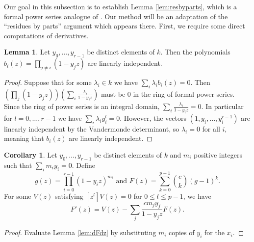 \documentclass{amsart}
\numberwithin{equation}{section}
\theoremstyle{definition}
\newtheorem{lemma}[theorem]{Lemma}
\newtheorem{corollary}[theorem]{Corollary}
\begin{document}
Our goal in this subsection is to establish Lemma \ref{lem:resbyparts}, which is a formal power series analogue of \cite[Lemma 3.4]{CE}.  Our method will be an adaptation of the ``residues by parts'' argument which appears there.  First, we require some direct computations of derivatives.

\begin{lemma}\label{lem:vand}Let $y_0, \ldots, y_{r - 1}$ be distinct elements of $k$.  Then the polynomials $b_i(z) = \prod_{j \neq i} (1 - y_j z)$ are linearly independent.
\end{lemma}
\begin{proof} 
Suppose that for some $\lambda_i \in k$ we have $\sum_i \lambda_ib_i(z)=0$.  Then $\left(\prod_j (1-y_jz)\right)\left(\sum_i \frac{\lambda_i}{1-y_iz}\right)$ must be $0$ in the ring of formal power series. Since the ring of power series is an integral domain, $\sum_i \frac{\lambda_i}{1-y_iz}=0$. In particular for $l=0,\dots,r-1$ we have $\sum_i \lambda_iy_i^l=0$.  However, the vectors $(1,y_i,\dots,y_i^{r-1})$ are linearly independent by the Vandermonde determinant, so $\lambda_i=0$ for all $i$, meaning that $b_i(z)$ are linearly independent.
\end{proof}

\begin{corollary}\label{corr:dFdz2}
Let $y_0,\dots,y_{r-1}$ be distinct elements of $k$ and $m_i$ positive integers such that $\sum_i m_iy_i=0$.  Define 
\[
g(z)=\prod_{i=0}^{r-1} (1-y_iz)^{m_i} \text{  and } F(z)=\sum_{k=0}^{p-1} \binom{c}{k}(g-1)^k.
\]
For some $V(z)$ satisfying $[z^l]V(z)=0$ for $0 \le l \le p-1$, we have
\[
F'(z)=V(z) - \sum_j \frac{cm_jy_j}{1-y_jz}F(z).
\]
\end{corollary}
\begin{proof}
Evaluate Lemma \ref{lem:dFdz} by substituting $m_i$ copies of $y_i$ for the $x_i$.
\end{proof}
\end{document}
